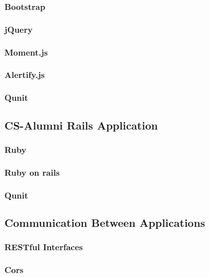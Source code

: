 \documentclass{article}
\begin{document}
\subsubsection{Bootstrap}

\subsubsection{jQuery}

\subsubsection{Moment.js}

\subsubsection{Alertify.js}

\subsubsection{Qunit}

\subsection{CS-Alumni Rails Application}

\subsubsection{Ruby}

\subsubsection{Ruby on rails}

\subsubsection{Qunit}

\subsection{Communication Between Applications}

\subsubsection{RESTful Interfaces}

\subsubsection{Cors}
\end{document}
